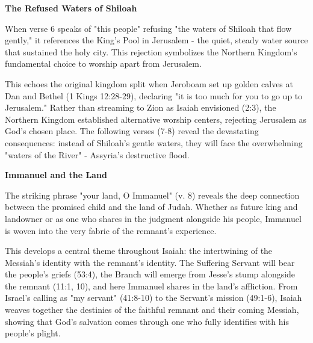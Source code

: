 \documentclass[11pt]{article}
\begin{document}
\vspace{3em}
{\large\bfseries The Refused Waters of Shiloah}
\vspace{1em}

When verse 6 speaks of "this people" refusing "the waters of Shiloah that flow gently," it references the King's Pool in Jerusalem - the quiet, steady water source that sustained the holy city. This rejection symbolizes the Northern Kingdom's fundamental choice to worship apart from Jerusalem.

\vspace{1em}
This echoes the original kingdom split when Jeroboam set up golden calves at Dan and Bethel (1 Kings 12:28-29), declaring "it is too much for you to go up to Jerusalem." Rather than streaming to Zion as Isaiah envisioned (2:3), the Northern Kingdom established alternative worship centers, rejecting Jerusalem as God's chosen place. The following verses (7-8) reveal the devastating consequences: instead of Shiloah's gentle waters, they will face the overwhelming "waters of the River" - Assyria's destructive flood.

\vspace{3em}
{\large\bfseries Immanuel and the Land}
\vspace{1em}

The striking phrase "your land, O Immanuel" (v. 8) reveals the deep connection between the promised child and the land of Judah. Whether as future king and landowner or as one who shares in the judgment alongside his people, Immanuel is woven into the very fabric of the remnant's experience.

\vspace{1em}
This develops a central theme throughout Isaiah: the intertwining of the Messiah's identity with the remnant's identity. The Suffering Servant will bear the people's griefs (53:4), the Branch will emerge from Jesse's stump alongside the remnant (11:1, 10), and here Immanuel shares in the land's affliction. From Israel's calling as "my servant" (41:8-10) to the Servant's mission (49:1-6), Isaiah weaves together the destinies of the faithful remnant and their coming Messiah, showing that God's salvation comes through one who fully identifies with his people's plight.

\begin{biblicaloutline}[Isaiah 8:9-10]

    \begin{versesection}{2em}

    \end{versesection}

\end{biblicaloutline}
\end{document}
